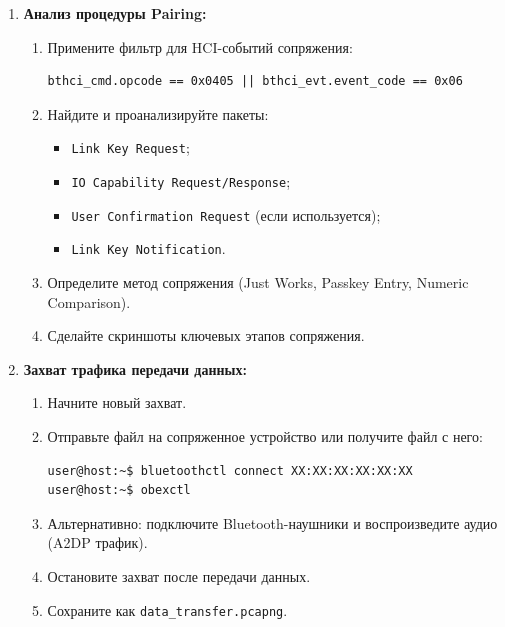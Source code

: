 \begin{enumerate}[nosep, leftmargin=*]
    \item \textbf{Анализ процедуры Pairing:}
    \begin{enumerate}[label=\alph*), nosep]
        \item Примените фильтр для HCI-событий сопряжения:
        \begin{lstlisting}
bthci_cmd.opcode == 0x0405 || bthci_evt.event_code == 0x06
        \end{lstlisting}
        \item Найдите и проанализируйте пакеты:
        \begin{itemize}[nosep]
            \item \texttt{Link Key Request};
            \item \texttt{IO Capability Request/Response};
            \item \texttt{User Confirmation Request} (если используется);
            \item \texttt{Link Key Notification}.
        \end{itemize}
        \item Определите метод сопряжения (Just Works, Passkey Entry, Numeric Comparison).
        \item Сделайте скриншоты ключевых этапов сопряжения.
    \end{enumerate}

    \item \textbf{Захват трафика передачи данных:}
    \begin{enumerate}[label=\alph*), nosep]
        \item Начните новый захват.
        \item Отправьте файл на сопряженное устройство или получите файл с него:
        \begin{lstlisting}
user@host:~$ bluetoothctl connect XX:XX:XX:XX:XX:XX
user@host:~$ obexctl
        \end{lstlisting}
        \item Альтернативно: подключите Bluetooth-наушники и воспроизведите аудио (A2DP трафик).
        \item Остановите захват после передачи данных.
        \item Сохраните как \texttt{data\_transfer.pcapng}.
    \end{enumerate}


\end{enumerate}
